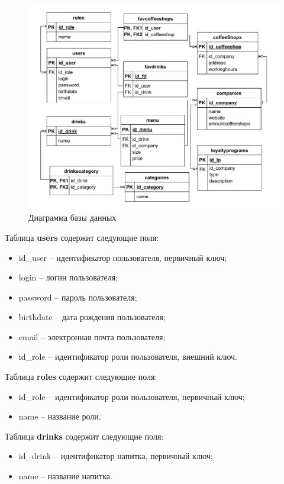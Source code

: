 \begin{figure}[H]
	\centering
	\includegraphics[width=1\linewidth]{img/db_diagram2605.pdf}
	\caption{Диаграмма базы данных}
	\label{db_diagram}
\end{figure}

Таблица \textbf{users} содержит следующие поля:
\begin{itemize}
	\item id\_user -- идентификатор пользователя, первичный ключ;%
	\item login -- логин пользователя;%
	\item password -- пароль пользователя; %
	\item birthdate -- дата рождения пользователя;%
	\item email -- электронная почта пользователя;%
	\item id\_role -- идентификатор роли пользователя, внешний ключ.%
\end{itemize}

Таблица \textbf{roles} содержит следующие поля:
\begin{itemize}
	\item id\_role -- идентификатор роли пользователя, первичный ключ;%
	\item name -- название роли.%
\end{itemize}

Таблица \textbf{drinks} содержит следующие поля:
\begin{itemize}
\item id\_drink -- идентификатор напитка, первичный ключ;%
\item name -- название напитка.%
\end{itemize}

